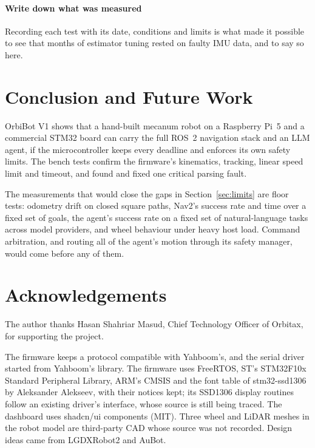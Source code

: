 \documentclass[11pt]{article}
\begin{document}
\paragraph{Write down what was measured} Recording each test with its date, conditions and limits is what made it possible to see that months of estimator tuning rested on faulty IMU data, and to say so here.

\section{Conclusion and Future Work}

OrbiBot V1 shows that a hand-built mecanum robot on a Raspberry Pi~5 and a commercial STM32 board can carry the full ROS~2 navigation stack and an LLM agent, if the microcontroller keeps every deadline and enforces its own safety limits. The bench tests confirm the firmware's kinematics, tracking, linear speed limit and timeout, and found and fixed one critical parsing fault.

The measurements that would close the gaps in Section~\ref{sec:limits} are floor tests: odometry drift on closed square paths, Nav2's success rate and time over a fixed set of goals, the agent's success rate on a fixed set of natural-language tasks across model providers, and wheel behaviour under heavy host load. Command arbitration, and routing all of the agent's motion through its safety manager, would come before any of them.

\section*{Acknowledgements}

The author thanks Hasan Shahriar Masud, Chief Technology Officer of Orbitax, for supporting the project.

The firmware keeps a protocol compatible with Yahboom's, and the serial driver started from Yahboom's library. The firmware uses FreeRTOS, ST's STM32F10x Standard Peripheral Library, ARM's CMSIS and the font table of stm32-ssd1306 by Aleksander Alekseev, with their notices kept; its SSD1306 display routines follow an existing driver's interface, whose source is still being traced. The dashboard uses shadcn/ui components (MIT). Three wheel and LiDAR meshes in the robot model are third-party CAD whose source was not recorded. Design ideas came from LGDXRobot2 and AuBot.
\end{document}
